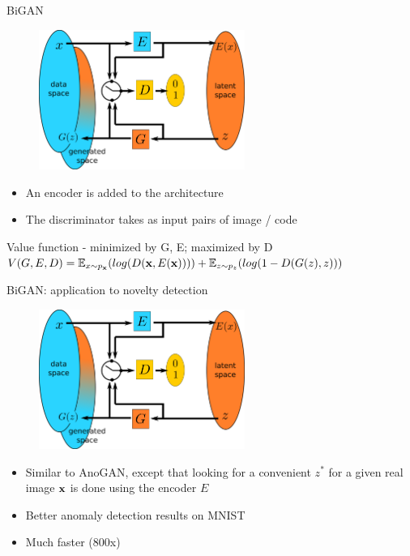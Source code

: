 \documentclass[xcolor=pdftex,dvipsnames,table,mathserif]{beamer}
\begin{document}
\begin{frame}{BiGAN}

  \begin{figure}[ht]
    \centering
    \includegraphics[width=0.6\textwidth]{bigan}
  \end{figure}

  \begin{itemize}
  \item An encoder is added to the architecture
  \item The discriminator takes as input pairs of image / code
  \end{itemize}

  \begin{block}{Value function - minimized by G, E; maximized by D}
    $V(G, E, D) = \mathbb{E}_{x \sim p_{\mathbf{x}}}(log(D(\mathbf{x}, E(\mathbf{x})))) + \mathbb{E}_{z \sim p_z}(log(1 - D(G(z), z)))$
  \end{block}


\end{frame}

\begin{frame}{BiGAN: application to novelty detection~\tiny{\cite{zenati_efficient_2018}}}

  \begin{figure}[ht]
    \centering
    \includegraphics[width=0.6\textwidth]{bigan}
  \end{figure}

  \begin{itemize}
  \item Similar to AnoGAN, except that looking for a convenient $z^*$ for a given real image $\mathbf{x}$ is done using the encoder $E$
  \item Better anomaly detection results on MNIST
  \item Much faster (800x)
  \end{itemize}


\end{frame}
\end{document}
